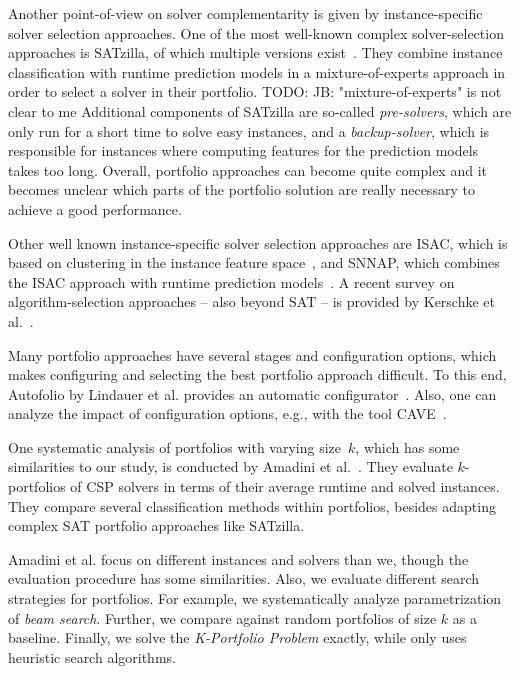 \documentclass[conference]{IEEEtran}
\newcommand{\todo}[1]{{\color{red}TODO: #1}}
\begin{document}
Another point-of-view on solver complementarity is given by instance-specific solver selection approaches. 
One of the most well-known complex solver-selection approaches is SATzilla, of which multiple versions exist~\cite{xu2008satzilla, xu2012satzilla2012}. 
They combine instance classification with runtime prediction models in a mixture-of-experts approach in order to select a solver in their portfolio. 
\todo{JB: "mixture-of-experts" is not clear to me}
Additional components of SATzilla are so-called \emph{pre-solvers}, which are only run for a short time to solve easy instances, and a \emph{backup-solver}, which is responsible for instances where computing features for the prediction models takes too long.
Overall, portfolio approaches can become quite complex and it becomes unclear which parts of the portfolio solution are really necessary to achieve a good performance.

Other well known instance-specific solver selection approaches are ISAC, which is based on clustering in the instance feature space~\cite{Kadioglu:2010:ISAC}, and SNNAP, which combines the ISAC approach with runtime prediction models~\cite{Collautti:2013:SNNAP}.
A recent survey on algorithm-selection approaches -- also beyond SAT -- is provided by Kerschke et al.~\cite{kerschke2019automated}.

Many portfolio approaches have several stages and configuration options, which makes configuring and selecting the best portfolio approach difficult.
To this end, Autofolio by Lindauer et al. provides an automatic configurator~\cite{lindauer2015autofolio}.
Also, one can analyze the impact of configuration options, e.g., with the tool CAVE~\cite{biedenkapp2018cave}.

One systematic analysis of portfolios with varying size~$k$, which has some similarities to our study, is conducted by Amadini et al.~\cite{amadini2014empirical, amadini2016extensive}.
They evaluate $k$-portfolios of CSP solvers in terms of their average runtime and solved instances. 
They compare several classification methods within portfolios, besides adapting complex SAT portfolio approaches like SATzilla. 

Amadini et al. focus on different instances and solvers than we, though the evaluation procedure has some similarities.
Also, we evaluate different search strategies for portfolios.
For example, we systematically analyze parametrization of \emph{beam search}.
Further, we compare against random portfolios of size $k$ as a baseline.
Finally, we solve the \emph{K-Portfolio Problem} exactly, while \cite{amadini2014empirical} only uses heuristic search algorithms. 
\end{document}
